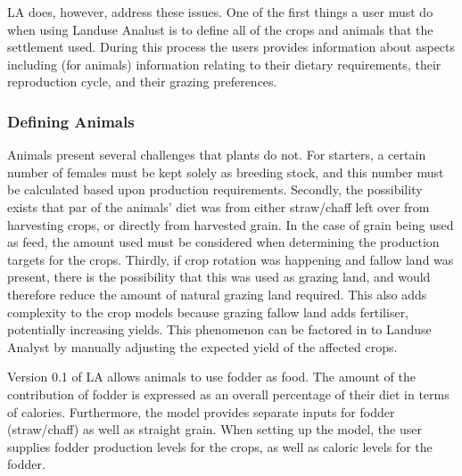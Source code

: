 LA does, however, address these issues.  One of the first things a user must do
when using Landuse Analust is to define all of the crops and animals that the
settlement used.  During this process the users provides information about
aspects including (for animals) information
relating to their dietary requirements, their reproduction cycle, and their
grazing preferences.

\subsubsection{Defining Animals}
  \label{definingAnimals}
Animals present several challenges that plants do not.  For starters, a certain
number of females must be kept solely as breeding stock, and this number must be
calculated based upon production requirements.  Secondly, the possibility exists that
par of the animals' diet was from either straw/chaff left over from harvesting
crops, or directly from harvested grain.  In the case of grain being used as
feed, the amount used must be considered when determining the production targets
for the crops.  Thirdly, if crop rotation was happening and fallow land was
present, there is the possibility that this was used as grazing land, and would
therefore reduce the amount of natural grazing land required.  This also adds
complexity to the crop models because grazing fallow land adds fertiliser,
potentially increasing yields.  This phenomenon can be factored in to Landuse
Analyst by manually adjusting the expected yield of the affected crops.

Version 0.1 of LA allows animals to use fodder as food.  The amount of the contribution of fodder is expressed as an overall percentage of their diet in terms of calories.  Furthermore, the model provides separate inputs for fodder (straw/chaff) as well as straight grain.  When setting up the model, the user supplies fodder production levels for the crops, as well as caloric levels for the fodder.

